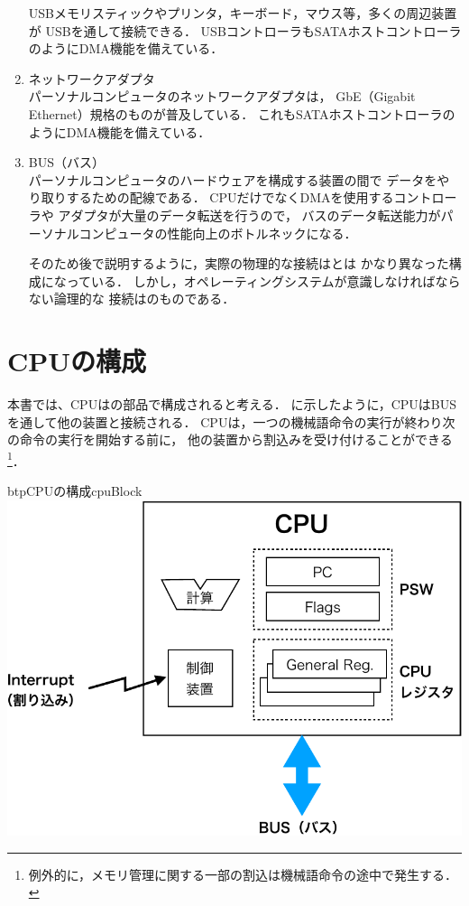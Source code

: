 \begin{enumerate}
  USBメモリスティックやプリンタ，キーボード，マウス等，多くの周辺装置が
  USBを通して接続できる．
  USBコントローラもSATAホストコントローラのようにDMA機能を備えている．
\item ネットワークアダプタ \\
  パーソナルコンピュータのネットワークアダプタは，
  GbE（Gigabit Ethernet）規格のものが普及している．
  これもSATAホストコントローラのようにDMA機能を備えている．
\item BUS（バス） \\
  パーソナルコンピュータのハードウェアを構成する装置の間で
  データをやり取りするための配線である．
  CPUだけでなくDMAを使用するコントローラや
  アダプタが大量のデータ転送を行うので，
  バスのデータ転送能力がパーソナルコンピュータの性能向上のボトルネックになる．

  そのため後で説明するように，実際の物理的な接続はとは
  かなり異なった構成になっている．
  しかし，オペレーティングシステムが意識しなければならない論理的な
  接続はのものである．
\end{enumerate}

\section{CPUの構成}
本書では、CPUはの部品で構成されると考える．
に示したように，CPUはBUSを通して他の装置と接続される．
CPUは，一つの機械語命令の実行が終わり次の命令の実行を開始する前に，
他の装置から割込みを受け付けることができる\footnote{
  例外的に，メモリ管理に関する一部の割込は機械語命令の途中で発生する．}．

\begin{myfig}{btp}{CPUの構成}{cpuBlock}
  \includegraphics[scale=0.66]{Fig/cpuBlock-crop.pdf}
\end{myfig}

